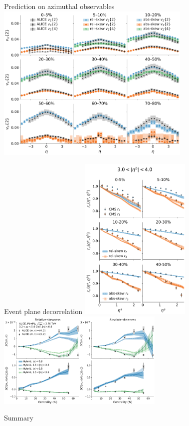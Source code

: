 \documentclass[11pt]{beamer}
\begin{document}
\begin{frame}{Prediction on azimuthal observables}
\includegraphics[width=0.7\textwidth]{vn_eta.pdf}
\end{frame}

\begin{frame}{Event plane decorrelation}
\includegraphics[width=0.4\textwidth]{evt_pln_decorr_near.pdf}
\includegraphics[width=0.6\textwidth]{smn.pdf}
\end{frame}

\begin{frame}{Summary}
\end{frame}
\end{document}
